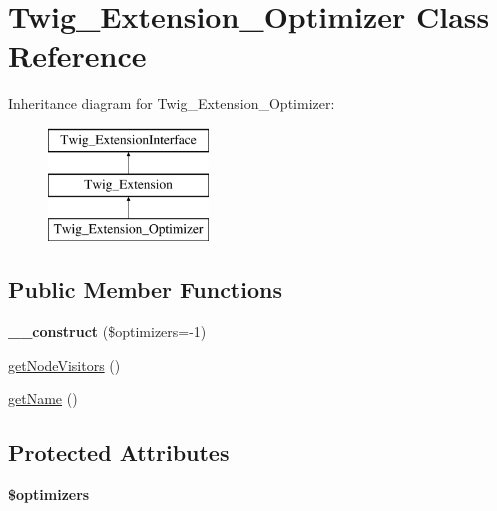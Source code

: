 \hypertarget{class_twig___extension___optimizer}{}\section{Twig\+\_\+\+Extension\+\_\+\+Optimizer Class Reference}
\label{class_twig___extension___optimizer}
Inheritance diagram for Twig\+\_\+\+Extension\+\_\+\+Optimizer\+:\begin{figure}[H]
\begin{center}
\leavevmode
\includegraphics[height=3.000000cm]{class_twig___extension___optimizer}
\end{center}
\end{figure}
\subsection*{Public Member Functions}
\begin{DoxyCompactItemize}
\item 
\hypertarget{class_twig___extension___optimizer_a39e1de056975cf1aea3660cbd2c0ebc9}{}{\bfseries \+\_\+\+\_\+construct} (\$optimizers=-\/1)\label{class_twig___extension___optimizer_a39e1de056975cf1aea3660cbd2c0ebc9}

\item 
\hyperlink{class_twig___extension___optimizer_aec02093179d390d22ae4083f23a1d74a}{get\+Node\+Visitors} ()
\item 
\hyperlink{class_twig___extension___optimizer_a3d0963e68bb313b163a73f2803c64600}{get\+Name} ()
\end{DoxyCompactItemize}
\subsection*{Protected Attributes}
\begin{DoxyCompactItemize}
\item 
\hypertarget{class_twig___extension___optimizer_ac72228b8f9868fc4880a13d6d823d754}{}{\bfseries \$optimizers}\label{class_twig___extension___optimizer_ac72228b8f9868fc4880a13d6d823d754}

\end{DoxyCompactItemize}


